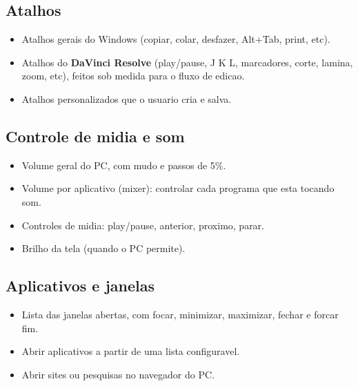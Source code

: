 \documentclass[11pt,a4paper]{article}
\begin{document}
\subsection{Atalhos}
\begin{itemize}
  \item Atalhos gerais do Windows (copiar, colar, desfazer, Alt+Tab, print, etc).
  \item Atalhos do \textbf{DaVinci Resolve} (play/pause, J K L, marcadores, corte, lamina,
  zoom, etc), feitos sob medida para o fluxo de edicao.
  \item Atalhos personalizados que o usuario cria e salva.
\end{itemize}

\subsection{Controle de midia e som}
\begin{itemize}
  \item Volume geral do PC, com mudo e passos de 5\%.
  \item Volume por aplicativo (mixer): controlar cada programa que esta tocando som.
  \item Controles de midia: play/pause, anterior, proximo, parar.
  \item Brilho da tela (quando o PC permite).
\end{itemize}

\subsection{Aplicativos e janelas}
\begin{itemize}
  \item Lista das janelas abertas, com focar, minimizar, maximizar, fechar e forcar fim.
  \item Abrir aplicativos a partir de uma lista configuravel.
  \item Abrir sites ou pesquisas no navegador do PC.
\end{itemize}
\end{document}
